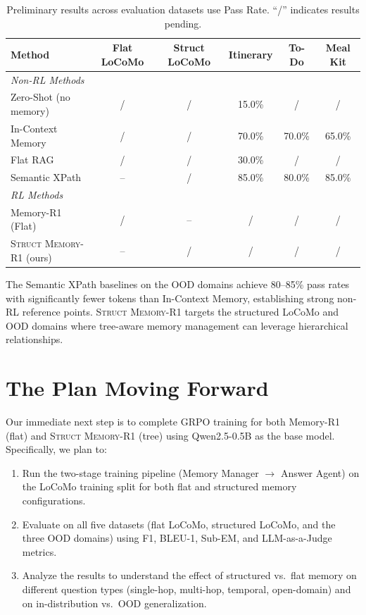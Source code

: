 \documentclass{article}
\theoremstyle{definition}
\begin{document}
\begin{table}[h]
\centering
\caption{Preliminary results across evaluation datasets use Pass Rate. ``/'' indicates results pending.}
\label{tab:preliminary}
\small
\begin{tabular}{lccccc}
\toprule
\textbf{Method} & \textbf{Flat LoCoMo} & \textbf{Struct LoCoMo} & \textbf{Itinerary} & \textbf{To-Do} & \textbf{Meal Kit} \\
\midrule
\multicolumn{6}{l}{\textit{Non-RL Methods}} \\
Zero-Shot (no memory) & / & / & 15.0\% & / & / \\
In-Context Memory & / & / & 70.0\% & 70.0\% & 65.0\% \\
Flat RAG & / & / & 30.0\% & / & / \\
Semantic XPath & -- & / & 85.0\% & 80.0\% & 85.0\% \\
\midrule
\multicolumn{6}{l}{\textit{RL Methods}} \\
Memory-R1 (Flat) & / & -- & / & / & / \\
\textsc{Struct Memory-R1} (ours) & -- & / & / & / & / \\
\bottomrule
\end{tabular}
\end{table}

The Semantic XPath baselines on the OOD domains achieve 80--85\% pass rates with significantly fewer tokens than In-Context Memory, establishing strong non-RL reference points. \textsc{Struct Memory-R1} targets the structured LoCoMo and OOD domains where tree-aware memory management can leverage hierarchical relationships.

\section{The Plan Moving Forward}

Our immediate next step is to complete GRPO training for both Memory-R1 (flat) and \textsc{Struct Memory-R1} (tree) using Qwen2.5-0.5B as the base model. Specifically, we plan to:
\begin{enumerate}[nosep]
    \item Run the two-stage training pipeline (Memory Manager $\to$ Answer Agent) on the LoCoMo training split for both flat and structured memory configurations.
    \item Evaluate on all five datasets (flat LoCoMo, structured LoCoMo, and the three OOD domains) using F1, BLEU-1, Sub-EM, and LLM-as-a-Judge metrics.
    \item Analyze the results to understand the effect of structured vs.\ flat memory on different question types (single-hop, multi-hop, temporal, open-domain) and on in-distribution vs.\ OOD generalization.
\end{enumerate}



\end{document}
